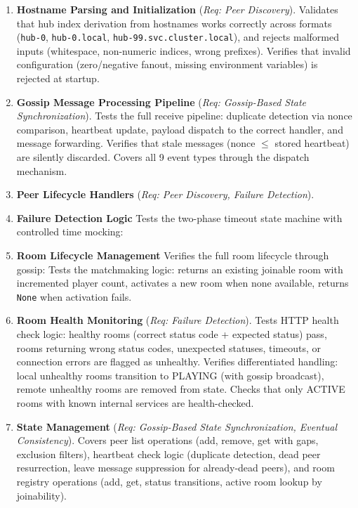 \begin{enumerate}
    \item \textbf{Hostname Parsing and Initialization} (\textit{Req: Peer Discovery}).
          Validates that hub index derivation from hostnames works correctly across formats (\texttt{hub-0}, \texttt{hub-0.local}, \texttt{hub-99.svc.cluster.local}), and rejects malformed inputs (whitespace, non-numeric indices, wrong prefixes).
          Verifies that invalid configuration (zero/negative fanout, missing environment variables) is rejected at startup.

    \item \textbf{Gossip Message Processing Pipeline} (\textit{Req: Gossip-Based State Synchronization}).
          Tests the full receive pipeline: duplicate detection via nonce comparison, heartbeat update, payload dispatch to the correct handler, and message forwarding.
          Verifies that stale messages (nonce $\leq$ stored heartbeat) are silently discarded.
          Covers all 9 event types through the dispatch mechanism.

    \item \textbf{Peer Lifecycle Handlers} (\textit{Req: Peer Discovery, Failure Detection}).

    \item \textbf{Failure Detection Logic} Tests the two-phase timeout state machine with controlled time mocking:

    \item \textbf{Room Lifecycle Management} Verifies the full room lifecycle through gossip:
          Tests the matchmaking logic: returns an existing joinable room with incremented player count, activates a new room when none available, returns \texttt{None} when activation fails.

    \item \textbf{Room Health Monitoring} (\textit{Req: Failure Detection}).
          Tests HTTP health check logic: healthy rooms (correct status code + expected status) pass, rooms returning wrong status codes, unexpected statuses, timeouts, or connection errors are flagged as unhealthy.
          Verifies differentiated handling: local unhealthy rooms transition to PLAYING (with gossip broadcast), remote unhealthy rooms are removed from state.
          Checks that only ACTIVE rooms with known internal services are health-checked.

    \item \textbf{State Management} (\textit{Req: Gossip-Based State Synchronization, Eventual Consistency}).
          Covers peer list operations (add, remove, get with gaps, exclusion filters), heartbeat check logic (duplicate detection, dead peer resurrection, leave message suppression for already-dead peers), and room registry operations (add, get, status transitions, active room lookup by joinability).


\end{enumerate}
